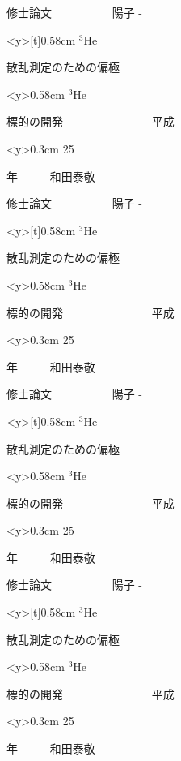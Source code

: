 \documentclass[11pt]{tbook}
\begin{document}
\parindent=0pt
{\large 修士論文 \ \ \ \ \ \ \ \ \ \ 陽子 -
\begin{minipage}<y>[t]{0.58cm}
$^{3}$He
\end{minipage}
散乱測定のための偏極
\begin{minipage}<y>{0.58cm}
$^{3}$He
\end{minipage}
標的の開発 \ \ \ \ \ \ \ \ \ \ \ \ \ \ \ 平成
\begin{minipage}<y>{0.3cm}
25
\end{minipage}
年 \ \ \ \ \ 和田泰敬
%
\vspace{40truept}
%

{\large 修士論文 \ \ \ \ \ \ \ \ \ \ 陽子 -
\begin{minipage}<y>[t]{0.58cm}
$^{3}$He
\end{minipage}
散乱測定のための偏極
\begin{minipage}<y>{0.58cm}
$^{3}$He
\end{minipage}
標的の開発 \ \ \ \ \ \ \ \ \ \ \ \ \ \ \ 平成
\begin{minipage}<y>{0.3cm}
25
\end{minipage}
年 \ \ \ \ \ 和田泰敬}
%
\vspace{40truept}
%

{\large 修士論文 \ \ \ \ \ \ \ \ \ \ 陽子 -
\begin{minipage}<y>[t]{0.58cm}
$^{3}$He
\end{minipage}
散乱測定のための偏極
\begin{minipage}<y>{0.58cm}
$^{3}$He
\end{minipage}
標的の開発 \ \ \ \ \ \ \ \ \ \ \ \ \ \ \ 平成
\begin{minipage}<y>{0.3cm}
25
\end{minipage}
年 \ \ \ \ \ 和田泰敬}
%
\vspace{40truept}
%

{\large 修士論文 \ \ \ \ \ \ \ \ \ \ 陽子 -
\begin{minipage}<y>[t]{0.58cm}
$^{3}$He
\end{minipage}
散乱測定のための偏極
\begin{minipage}<y>{0.58cm}
$^{3}$He
\end{minipage}
標的の開発 \ \ \ \ \ \ \ \ \ \ \ \ \ \ \ 平成
\begin{minipage}<y>{0.3cm}
25
\end{minipage}
年 \ \ \ \ \ 和田泰敬}
%
\vspace{40truept}
%

}
\end{document}
